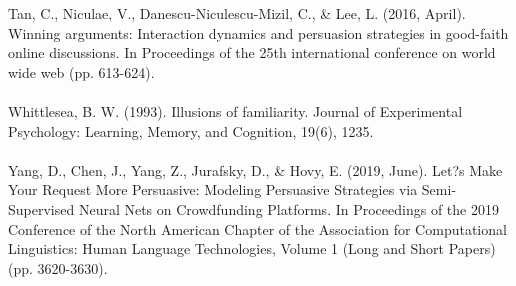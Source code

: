 \documentclass[11pt,a4paper]{article}
\begin{document}
Tan, C., Niculae, V., Danescu-Niculescu-Mizil, C., \& Lee, L. (2016, April). Winning arguments: Interaction dynamics and persuasion strategies in good-faith online discussions. In Proceedings of the 25th international conference on world wide web (pp. 613-624).
\\\\
Whittlesea, B. W. (1993). Illusions of familiarity. Journal of Experimental Psychology: Learning, Memory, and Cognition, 19(6), 1235.
\\\\
Yang, D., Chen, J., Yang, Z., Jurafsky, D., \& Hovy, E. (2019, June). Let?s Make Your Request More Persuasive: Modeling Persuasive Strategies via Semi-Supervised Neural Nets on Crowdfunding Platforms. In Proceedings of the 2019 Conference of the North American Chapter of the Association for Computational Linguistics: Human Language Technologies, Volume 1 (Long and Short Papers) (pp. 3620-3630).
\end{document}
